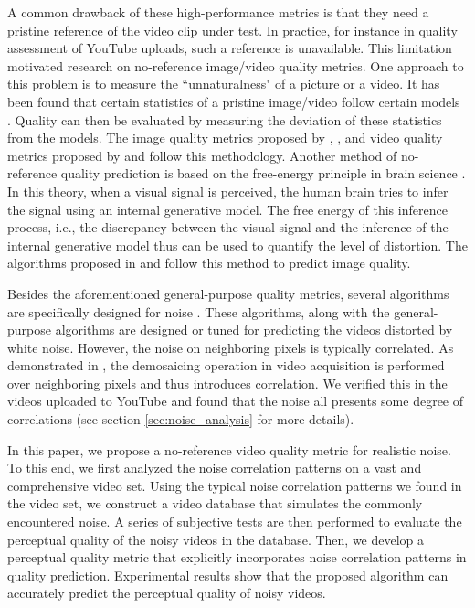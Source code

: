 \documentclass{sig-alternate}
\begin{document}
A common drawback of these high-performance metrics is that they need a pristine reference of the video clip under test. In practice, for instance in quality assessment of YouTube uploads, such a reference is unavailable. This limitation motivated research on no-reference image/video quality metrics. One approach to this problem is to measure the ``unnaturalness" of a picture or a video. It has been found that certain statistics of a pristine image/video follow certain models\cite{SriLeeSimZhu2003} \cite{ZorWei2009}. Quality can then be evaluated by measuring the deviation of these statistics from the models. The image quality metrics proposed by \cite{NIQE}, \cite{DIIVINE}, \cite{HNR} and video quality metrics proposed by \cite{BLIINDS} and \cite{ZhuLiAsaSau2015} follow this methodology. Another method of no-reference quality prediction is based on the free-energy principle in brain science \cite{Fri2010}. In this theory, when a visual signal is perceived, the human brain tries to infer the signal using an internal generative model. The free energy of this inference process, i.e., the discrepancy between the visual signal and the inference of the internal generative model thus can be used to quantify the level of distortion. The algorithms proposed in \cite{LiuZhaZhaSunGuYan2014} and \cite{ZhaWuYanLinZha2012} follow this method to predict image quality.

Besides the aforementioned general-purpose quality metrics, several algorithms are specifically designed for noise \cite{LimPar2014,ZhaKauWanYan2013,ZhaWu2011}. These algorithms, along with the general-purpose algorithms are designed or tuned for predicting the videos distorted by white noise. However, the noise on neighboring pixels is typically correlated. As demonstrated in \cite{SeyKeiKnoSte2013}, the demosaicing operation in video acquisition is performed over neighboring pixels and thus introduces correlation. We verified this in the videos uploaded to YouTube and found that the noise all presents some degree of correlations (see section \ref{sec:noise_analysis} for more details).

In this paper, we propose a no-reference video quality metric for realistic noise. To this end, we first analyzed the noise correlation patterns on a vast and comprehensive video set. Using the typical noise correlation patterns we found in the video set, we construct a video database that simulates the commonly encountered noise. A series of subjective tests are then performed to evaluate the perceptual quality of the noisy videos in the database. Then, we develop a perceptual quality metric that explicitly incorporates noise correlation patterns in quality prediction. Experimental results show that the proposed algorithm can accurately predict the perceptual quality of noisy videos. 
\end{document}

